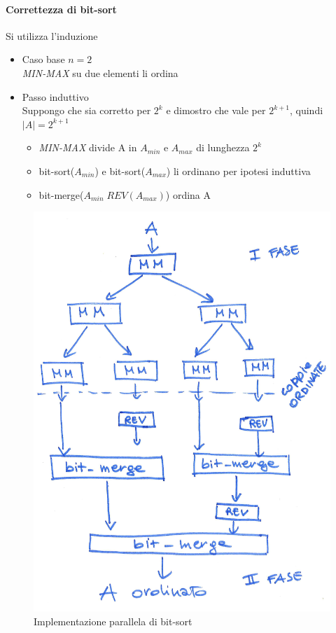 \paragraph{Correttezza di bit-sort}
Si utilizza l'induzione
\begin{itemize}
    \item Caso base $n=2$\\
    \textit{MIN-MAX} su due elementi li ordina
    \item Passo induttivo\\
    Suppongo che sia corretto per $2^k$ e dimostro che vale per $2^{k+1}$, quindi $|A| = 2^{k+1}$

    \begin{itemize}
        \item \textit{MIN-MAX} divide A in $A_{min}$ e $A_{max}$ di lunghezza $2^k$
        \item bit-sort($A_{min}$) e bit-sort($A_{max}$) li ordinano per ipotesi induttiva
        \item bit-merge($A_{min}\;REV(A_{max})$) ordina A
    \end{itemize}
\end{itemize}

\begin{figure}[h]
    \centering
    \includegraphics[scale=0.4]{images/bitsort_parallelo.png}
    \caption{Implementazione parallela di bit-sort}
\end{figure}

